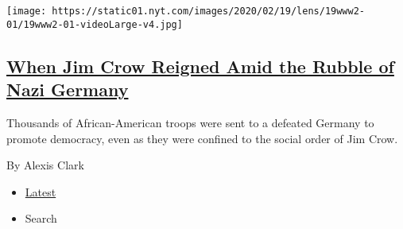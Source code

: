 \begin{enumerate}
  \texttt{[image: https://static01.nyt.com/images/2020/02/19/lens/19www2-01/19www2-01-videoLarge-v4.jpg]}

  \hypertarget{when-jim-crow-reigned-amid-the-rubble-of-nazi-germany}{%
  \subsection{\texorpdfstring{\href{/2020/02/19/magazine/blacks-wwii-racism-germany.html}{When
  Jim Crow Reigned Amid the Rubble of Nazi
  Germany}}{When Jim Crow Reigned Amid the Rubble of Nazi Germany}}\label{when-jim-crow-reigned-amid-the-rubble-of-nazi-germany}}

  Thousands of African-American troops were sent to a defeated Germany
  to promote democracy, even as they were confined to the social order
  of Jim Crow.

  By Alexis Clark
\end{enumerate}

\begin{itemize}
\tightlist
\item
  \protect\hyperlink{stream-panel}{Latest}
\item
  Search
\end{itemize}

